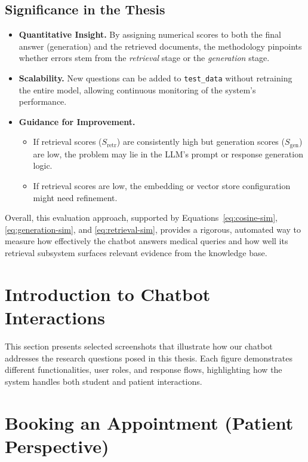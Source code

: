 \subsection{Significance in the Thesis}
\begin{itemize}
    \item \textbf{Quantitative Insight.} By assigning numerical scores to both the final answer (generation) and the retrieved documents, the methodology pinpoints whether errors stem from the \emph{retrieval} stage or the \emph{generation} stage.
    \item \textbf{Scalability.} New questions can be added to \texttt{test\_data} without retraining the entire model, allowing continuous monitoring of the system’s performance.
    \item \textbf{Guidance for Improvement.} 
    \begin{itemize}
        \item If retrieval scores ($S_\mathrm{retr}$) are consistently high but generation scores ($S_\mathrm{gen}$) are low, the problem may lie in the LLM’s prompt or response generation logic.
        \item If retrieval scores are low, the embedding or vector store configuration might need refinement.
    \end{itemize}
\end{itemize}

\noindent
Overall, this evaluation approach, supported by Equations~\ref{eq:cosine-sim}, \ref{eq:generation-sim}, and \ref{eq:retrieval-sim}, provides a rigorous, automated way to measure how effectively the chatbot answers medical queries and how well its retrieval subsystem surfaces relevant evidence from the knowledge base.

\label{sec:results}

\section{Introduction to Chatbot Interactions}
This section presents selected screenshots that illustrate how our chatbot addresses the research questions posed in this thesis. Each figure demonstrates different functionalities, user roles, and response flows, highlighting how the system handles both student and patient interactions.

\section{Booking an Appointment (Patient Perspective)}
\label{sec:booking-appointment}

